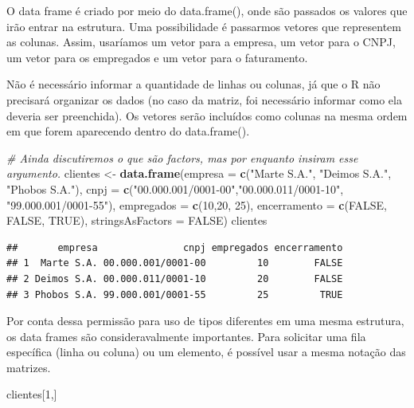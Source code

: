 \documentclass[
]{book}
\newenvironment{Shaded}{\begin{snugshade}}{\end{snugshade}}
\newcommand{\CommentTok}[1]{\textcolor[rgb]{0.56,0.35,0.01}{\textit{#1}}}
\newcommand{\DataTypeTok}[1]{\textcolor[rgb]{0.13,0.29,0.53}{#1}}
\newcommand{\DecValTok}[1]{\textcolor[rgb]{0.00,0.00,0.81}{#1}}
\newcommand{\KeywordTok}[1]{\textcolor[rgb]{0.13,0.29,0.53}{\textbf{#1}}}
\newcommand{\NormalTok}[1]{#1}
\newcommand{\OtherTok}[1]{\textcolor[rgb]{0.56,0.35,0.01}{#1}}
\newcommand{\StringTok}[1]{\textcolor[rgb]{0.31,0.60,0.02}{#1}}
\begin{document}
O data frame é criado por meio do data.frame(), onde são passados os valores que irão entrar na estrutura. Uma possibilidade é passarmos vetores que representem as colunas. Assim, usaríamos um vetor para a empresa, um vetor para o CNPJ, um vetor para os empregados e um vetor para o faturamento.

Não é necessário informar a quantidade de linhas ou colunas, já que o R não precisará organizar os dados (no caso da matriz, foi necessário informar como ela deveria ser preenchida). Os vetores serão incluídos como colunas na mesma ordem em que forem aparecendo dentro do data.frame().

\begin{Shaded}
\begin{Highlighting}[]
\CommentTok{# Ainda discutiremos o que são factors, mas por enquanto insiram esse argumento.}
\NormalTok{clientes <-}\StringTok{ }\KeywordTok{data.frame}\NormalTok{(}\DataTypeTok{empresa =} \KeywordTok{c}\NormalTok{(}\StringTok{"Marte S.A."}\NormalTok{, }\StringTok{"Deimos S.A."}\NormalTok{, }\StringTok{"Phobos S.A."}\NormalTok{), }
                       \DataTypeTok{cnpj =} \KeywordTok{c}\NormalTok{(}\StringTok{"00.000.001/0001-00"}\NormalTok{,}\StringTok{"00.000.011/0001-10"}\NormalTok{, }\StringTok{"99.000.001/0001-55"}\NormalTok{),}
                       \DataTypeTok{empregados =} \KeywordTok{c}\NormalTok{(}\DecValTok{10}\NormalTok{,}\DecValTok{20}\NormalTok{, }\DecValTok{25}\NormalTok{), }
                       \DataTypeTok{encerramento =} \KeywordTok{c}\NormalTok{(}\OtherTok{FALSE}\NormalTok{, }\OtherTok{FALSE}\NormalTok{, }\OtherTok{TRUE}\NormalTok{),}
                       \DataTypeTok{stringsAsFactors =} \OtherTok{FALSE}\NormalTok{)}
\NormalTok{clientes}
\end{Highlighting}
\end{Shaded}

\begin{verbatim}
##       empresa               cnpj empregados encerramento
## 1  Marte S.A. 00.000.001/0001-00         10        FALSE
## 2 Deimos S.A. 00.000.011/0001-10         20        FALSE
## 3 Phobos S.A. 99.000.001/0001-55         25         TRUE
\end{verbatim}

Por conta dessa permissão para uso de tipos diferentes em uma mesma estrutura, os data frames são consideravalmente importantes. Para solicitar uma fila específica (linha ou coluna) ou um elemento, é possível usar a mesma notação das matrizes.

\begin{Shaded}
\begin{Highlighting}[]
\NormalTok{clientes[}\DecValTok{1}\NormalTok{,]}
\end{Highlighting}
\end{Shaded}
\end{document}
